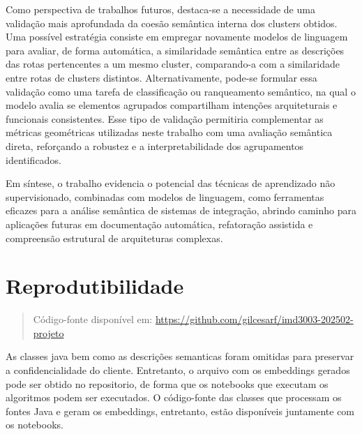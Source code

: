 \documentclass[12pt,a4paper]{article}
\begin{document}
Como perspectiva de trabalhos futuros, destaca-se a necessidade de uma validação mais aprofundada da coesão semântica interna dos clusters obtidos. Uma possível estratégia consiste em empregar novamente modelos de linguagem para avaliar, de forma automática, a similaridade semântica entre as descrições das rotas pertencentes a um mesmo cluster, comparando-a com a similaridade entre rotas de clusters distintos. Alternativamente, pode-se formular essa validação como uma tarefa de classificação ou ranqueamento semântico, na qual o modelo avalia se elementos agrupados compartilham intenções arquiteturais e funcionais consistentes. Esse tipo de validação permitiria complementar as métricas geométricas utilizadas neste trabalho com uma avaliação semântica direta, reforçando a robustez e a interpretabilidade dos agrupamentos identificados.

Em síntese, o trabalho evidencia o potencial das técnicas de aprendizado não supervisionado, combinadas com modelos de linguagem, como ferramentas eficazes para a análise semântica de sistemas de integração, abrindo caminho para aplicações futuras em documentação automática, refatoração assistida e compreensão estrutural de arquiteturas complexas.


\section*{Reprodutibilidade}

\begin{quote}
Código-fonte disponível em: 
\newline
\url{https://github.com/gilcesarf/imd3003-202502-projeto}
\end{quote}

As classes java bem como as descrições semanticas foram omitidas para preservar a confidencialidade do cliente. Entretanto, o arquivo com os embeddings gerados pode ser obtido no repositorio, de forma que os notebooks que executam os algoritmos podem ser executados.
O código-fonte das classes que processam os fontes Java e geram os embeddings, entretanto, estão disponíveis juntamente com os notebooks.
\end{document}
